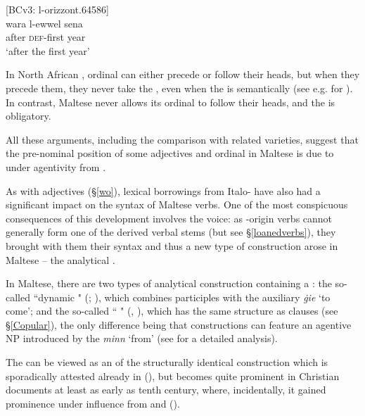 \documentclass[output=paper]{langsci/langscibook}
\begin{document}
\ea\label{wo2}
	{[BCv3: l-orizzont.64586]}\\
	\gll wara l-ewwel sena\\
	after \textsc{def}-first year\\
	\glt `after the first year'\\
\z

In North African , ordinal  can either precede or follow their heads, but when they precede them, they never take the  , even when the  is semantically  (see e.g. \citealt[284]{Ritt-Benmimoun2014} for  ). In contrast, Maltese never allows its ordinal  to follow their heads, and the   is obligatory.

All these arguments, including the comparison with related  varieties, suggest that the pre-nominal position of some adjectives and ordinal  in Maltese is due to  under  agentivity from .

\largerpage %
As with adjectives (§\ref{wo}), lexical borrowings from Italo- have also had a significant impact on the syntax of Maltese verbs. One of the most conspicuous consequences of this development involves the  voice: as -origin verbs cannot generally form one of the  derived verbal stems (but see §\ref{loanedverbs}), they brought with them their  syntax and thus a new type of  construction arose in Maltese -- the analytical .

In Maltese, there are two types of analytical  construction containing a  : the so-called ``dynamic " (\citealt[321--324]{Vanhove1993}; \citealt[214]{BorgAzzopardi-Alexander1997}), which combines  participles with the  auxiliary \textit{ġie} `to come'; and the so-called `` " (\citealt[214]{BorgAzzopardi-Alexander1997}, \citealt[318--320]{Vanhove1993}), which has the same structure as  clauses (see §\ref{Copular}), the only difference being that   constructions can feature an agentive NP introduced by the  \textit{minn} `from' (see \citealt[104--107]{bulbul2018} for a detailed analysis).

The   can be viewed as an  of the structurally identical construction which is sporadically attested already in   (\citealt[76--84]{Ullmann1989}), but becomes quite prominent in Christian  documents at least as early as tenth century, where, incidentally, it gained prominence under influence from  and  (\citealt[424]{Blau1967}).
\end{document}
